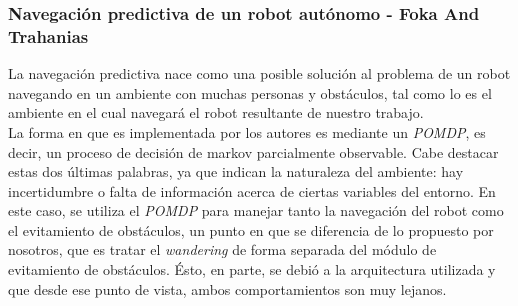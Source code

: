 \subsubsection{Navegaci\'on predictiva de un robot aut\'onomo - Foka And
Trahanias \cite{Foka02predictiveautonomous}}
La navegaci\'on predictiva nace como una posible soluci\'on al problema de un
robot navegando en un ambiente con muchas personas y obst\'aculos, tal como lo
es el ambiente en el cual navegar\'a el robot resultante de nuestro trabajo.
\\
La forma en que es implementada por los autores es mediante un \emph{POMDP}, es
decir, un proceso de decisi\'on de markov parcialmente observable. Cabe 
destacar estas dos \'ultimas palabras, ya que indican la naturaleza del
ambiente: hay incertidumbre o falta de informaci\'on acerca de ciertas
variables del entorno. En este caso, se utiliza el \emph{POMDP} para manejar
tanto la navegaci\'on del robot como el evitamiento de obst\'aculos, un punto
en que se diferencia de lo propuesto por nosotros, que es tratar el 
\emph{wandering} de forma separada del m\'odulo de evitamiento de obst\'aculos.
\'Esto, en parte, se debi\'o a la arquitectura utilizada y que desde ese punto
de vista, ambos comportamientos son muy lejanos.

